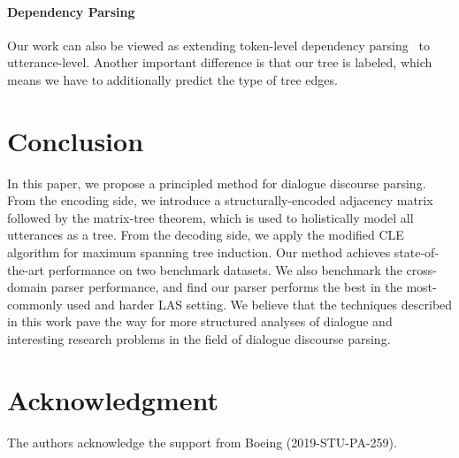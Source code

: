\documentclass[11pt]{article}
\begin{document}
\paragraph{Dependency Parsing}
Our work can also be viewed as extending token-level dependency parsing~\cite{mel1988dependency,koo2007structured,smith2008dependency,koo2010efficient,chen2014fast,dozat2016deep,qi2019universal,choi2011getting} to utterance-level. Another important difference is that our tree is labeled, which means we have to additionally predict the type of tree edges.

\section{Conclusion}
In this paper, we propose a principled method for dialogue discourse parsing. From the encoding side, we introduce a structurally-encoded adjacency matrix followed by the matrix-tree theorem, which is used to holistically model all utterances as a tree. From the decoding side, we apply the modified CLE algorithm for maximum spanning tree induction. Our method achieves state-of-the-art performance on two benchmark datasets. We also benchmark the cross-domain parser performance, and find our parser performs the best in the most-commonly used and harder LAS setting. We believe that the techniques described in this work pave the way for more structured analyses of dialogue and interesting research problems in the field of dialogue discourse parsing.

\section*{Acknowledgment}
The authors acknowledge the support from Boeing (2019-STU-PA-259).


\end{document}
